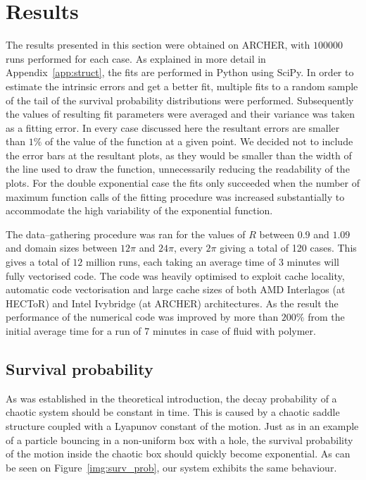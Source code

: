 \documentclass[11pt,a4paper]{article}
\begin{document}
\section{Results}
The results presented in this section were obtained on ARCHER, with $100000$ runs performed for each case.
As explained in more detail in Appendix~\ref{app:struct}, the fits are performed in Python using SciPy.
In order to estimate the intrinsic errors and get a better fit, multiple fits to a random sample of the tail of the survival probability distributions were performed.
Subsequently the values of resulting fit parameters were averaged and their variance was taken as a fitting error.
In every case discussed here the resultant errors are smaller than $1\%$ of the value of the function at a given point.
We decided not to include the error bars at the resultant plots, as they would be smaller than the width of the line used to draw the function, unnecessarily reducing the readability of the plots.
For the double exponential case the fits only succeeded when the number of maximum function calls of the fitting procedure was increased substantially to accommodate the high variability of the exponential function.

The data--gathering procedure was ran for the values of $R$ between $0.9$ and $1.09$ and domain sizes between $12\pi$ and $24\pi$, every $2\pi$ giving a total of 120 cases.
This gives a total of $12$ million runs, each taking an average time of 3 minutes will fully vectorised code.
The code was heavily optimised to exploit cache locality, automatic code vectorisation and large cache sizes of both AMD Interlagos (at HECToR) and Intel Ivybridge (at ARCHER) architectures.
As the result the performance of the numerical code was improved by more than $200\%$ from the initial average time for a run of 7 minutes in case of fluid with polymer.


\subsection{Survival probability}
As was established in the theoretical introduction, the decay probability of a chaotic system should be constant in time.
This is caused by a chaotic saddle structure coupled with a Lyapunov constant of the motion.
Just as in an example of a particle bouncing in a non-uniform box with a hole, the survival probability of the motion inside the chaotic box should quickly become exponential.
As can be seen on Figure~\ref{img:surv_prob}, our system exhibits the same behaviour.
\end{document}
